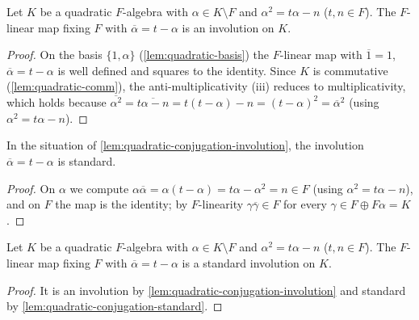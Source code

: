 \begin{lemma}
    \label{lem:quadratic-conjugation-involution}
    Let $K$ be a quadratic $F$-algebra with $\alpha \in K \setminus F$ and
    $\alpha^2 = t\alpha - n$ ($t,n \in F$). The $F$-linear map fixing $F$ with
    $\overline{\alpha} = t - \alpha$ is an involution on $K$.
\end{lemma}
\begin{proof}
    On the basis $\{1,\alpha\}$ (\ref{lem:quadratic-basis}) the $F$-linear map with
    $\overline 1 = 1$, $\overline\alpha = t-\alpha$ is well defined and squares to
    the identity. Since $K$ is commutative (\ref{lem:quadratic-comm}), the
    anti-multiplicativity (iii) reduces to multiplicativity, which holds because
    $\overline{\alpha^2} = \overline{t\alpha - n} = t(t-\alpha) - n = (t-\alpha)^2
    = \overline\alpha^2$ (using $\alpha^2 = t\alpha - n$).
\end{proof}

\begin{lemma}
    \label{lem:quadratic-conjugation-standard}
    In the situation of \ref{lem:quadratic-conjugation-involution}, the involution
    $\overline{\alpha} = t - \alpha$ is standard.
\end{lemma}
\begin{proof}
    On $\alpha$ we compute $\alpha\overline\alpha = \alpha(t-\alpha) = t\alpha -
    \alpha^2 = n \in F$ (using $\alpha^2 = t\alpha - n$), and on $F$ the map is the
    identity; by $F$-linearity $\gamma\overline\gamma \in F$ for every
    $\gamma \in F \oplus F\alpha = K$.
\end{proof}

\begin{lemma}
    \label{lem:quadratic-involution-exists}
    Let $K$ be a quadratic $F$-algebra with $\alpha \in K \setminus F$ and
    $\alpha^2 = t\alpha - n$ ($t,n \in F$). The $F$-linear map fixing $F$ with
    $\overline{\alpha} = t - \alpha$ is a standard involution on $K$.
\end{lemma}
\begin{proof}
    It is an involution by \ref{lem:quadratic-conjugation-involution} and standard
    by \ref{lem:quadratic-conjugation-standard}.
\end{proof}

